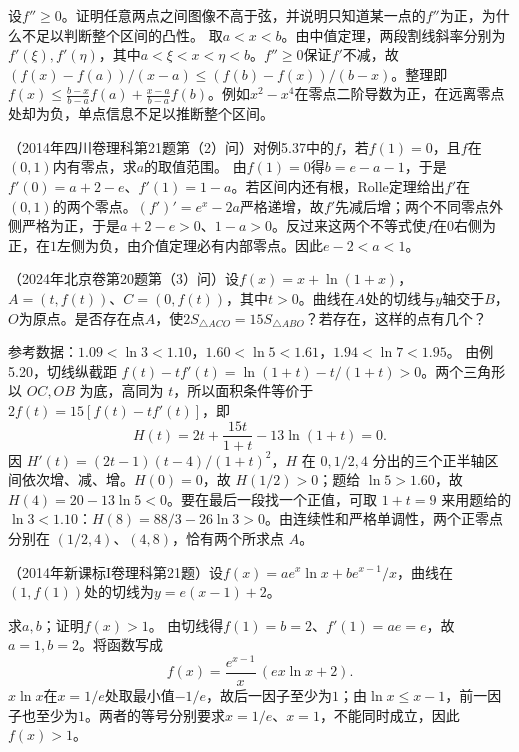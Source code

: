 设\(f''\ge0\)。证明任意两点之间图像不高于弦，并说明只知道某一点的\(f''\)为正，为什么不足以判断整个区间的凸性。
\solutionanswer
取\(a<x<b\)。由中值定理，两段割线斜率分别为\(f'(\xi),f'(\eta)\)，其中\(a<\xi<x<\eta<b\)。\(f''\ge0\)保证\(f'\)不减，故\((f(x)-f(a))/(x-a)\le(f(b)-f(x))/(b-x)\)。整理即\(f(x)\le\frac{b-x}{b-a}f(a)+\frac{x-a}{b-a}f(b)\)。例如\(x^2-x^4\)在零点二阶导数为正，在远离零点处却为负，单点信息不足以推断整个区间。


（2014年四川卷理科第21题第（2）问）对例5.37中的\(f\)，若\(f(1)=0\)，且\(f\)在\((0,1)\)内有零点，求\(a\)的取值范围。
\solutionanswer
由\(f(1)=0\)得\(b=e-a-1\)，于是\(f'(0)=a+2-e\)、\(f'(1)=1-a\)。若区间内还有根，Rolle定理给出\(f'\)在\((0,1)\)的两个零点。\((f')'=e^x-2a\)严格递增，故\(f'\)先减后增；两个不同零点外侧严格为正，于是\(a+2-e>0\)、\(1-a>0\)。反过来这两个不等式使\(f\)在\(0\)右侧为正，在\(1\)左侧为负，由介值定理必有内部零点。因此\(e-2<a<1\)。


（2024年北京卷第20题第（3）问）设\(f(x)=x+\ln(1+x)\)，\(A=(t,f(t))\)、\(C=(0,f(t))\)，其中\(t>0\)。曲线在\(A\)处的切线与\(y\)轴交于\(B\)，\(O\)为原点。是否存在点\(A\)，使\(2S_{\triangle ACO}=15S_{\triangle ABO}\)？若存在，这样的点有几个？

参考数据：\(1.09<\ln3<1.10\)，\(1.60<\ln5<1.61\)，\(1.94<\ln7<1.95\)。
\solutionanswer
由例5.20，切线纵截距 \(f(t)-tf'(t)=\ln(1+t)-t/(1+t)>0\)。两个三角形以 \(OC,OB\) 为底，高同为 \(t\)，所以面积条件等价于 \(2f(t)=15[f(t)-tf'(t)]\)，即
\[
 H(t)=2t+\frac{15t}{1+t}-13\ln(1+t)=0.
\]
因 \(H'(t)=(2t-1)(t-4)/(1+t)^2\)，\(H\) 在 \(0,1/2,4\) 分出的三个正半轴区间依次增、减、增。\(H(0)=0\)，故 \(H(1/2)>0\)；题给 \(\ln5>1.60\)，故 \(H(4)=20-13\ln5<0\)。要在最后一段找一个正值，可取 \(1+t=9\) 来用题给的 \(\ln3<1.10\)：\(H(8)=88/3-26\ln3>0\)。由连续性和严格单调性，两个正零点分别在 \((1/2,4)\)、\((4,8)\)，恰有两个所求点 \(A\)。


（2014年新课标I卷理科第21题）设\(f(x)=ae^x\ln x+be^{x-1}/x\)，曲线在\((1,f(1))\)处的切线为\(y=e(x-1)+2\)。

求\(a,b\)；证明\(f(x)>1\)。
\solutionanswer
由切线得\(f(1)=b=2\)、\(f'(1)=ae=e\)，故\(a=1,b=2\)。将函数写成
\[
 f(x)=\frac{e^{x-1}}x\,(ex\ln x+2).
\]
\(x\ln x\)在\(x=1/e\)处取最小值\(-1/e\)，故后一因子至少为\(1\)；由\(\ln x\le x-1\)，前一因子也至少为\(1\)。两者的等号分别要求\(x=1/e\)、\(x=1\)，不能同时成立，因此\(f(x)>1\)。


